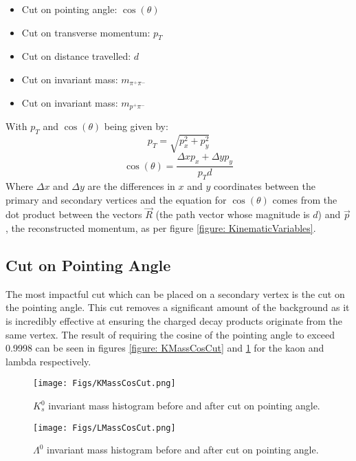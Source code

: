 \documentclass{article}
\begin{document}
\begin{itemize}
    \item Cut on pointing angle: $\cos(\theta)$ 
    \item Cut on transverse momentum: $p_T$
    \item Cut on distance travelled: $d$
    \item Cut on invariant mass: $m_{\pi^+\pi^-}$
    \item Cut on invariant mass: $m_{p^+\pi^-}$
\end{itemize}

With $p_T$ and $\cos(\theta)$ being given by:
\begin{equation}
    p_T = \sqrt{p_x^2 + p_y^2}
\end{equation}
\begin{equation}
    \cos(\theta) = \frac{\Delta x p_x + \Delta y p_y}{p_Td}
\end{equation}
Where $\Delta x$ and $\Delta y$ are the differences in $x$ and $y$ coordinates between the primary 
and secondary vertices and the equation for $\cos(\theta)$ comes from the dot product between the 
vectors $\vec{R}$ (the path vector whose magnitude is $d$) and $\vec{p}$, the reconstructed momentum, 
as per figure \ref{figure: KinematicVariables}.


\subsection{Cut on Pointing Angle}
The most impactful cut which can be placed on a secondary vertex is the cut on the pointing angle. 
This cut removes a significant amount of the background as it is incredibly effective at ensuring the 
charged decay products originate from the same vertex. The result of requiring the cosine of the 
pointing angle to exceed 0.9998 can be seen in figures \ref{figure: KMassCosCut} and \ref{figure: LMassCosCut}
for the kaon and lambda respectively.
\begin{figure}[!h]
\centering
\begin{minipage}{.48\textwidth}
\centering
\texttt{[image: Figs/KMassCosCut.png]}
\caption{\small $K_s^0$ invariant mass histogram before and after cut on pointing angle.}
\label{figure: KMassCosCut}
\end{minipage}%
\hfill
\begin{minipage}{.48\textwidth}
\centering
\texttt{[image: Figs/LMassCosCut.png]}
\caption{\small $\Lambda^0$ invariant mass histogram before and after cut on
pointing angle.} \label{figure: LMassCosCut}
\end{minipage}
\end{figure}
\end{document}
